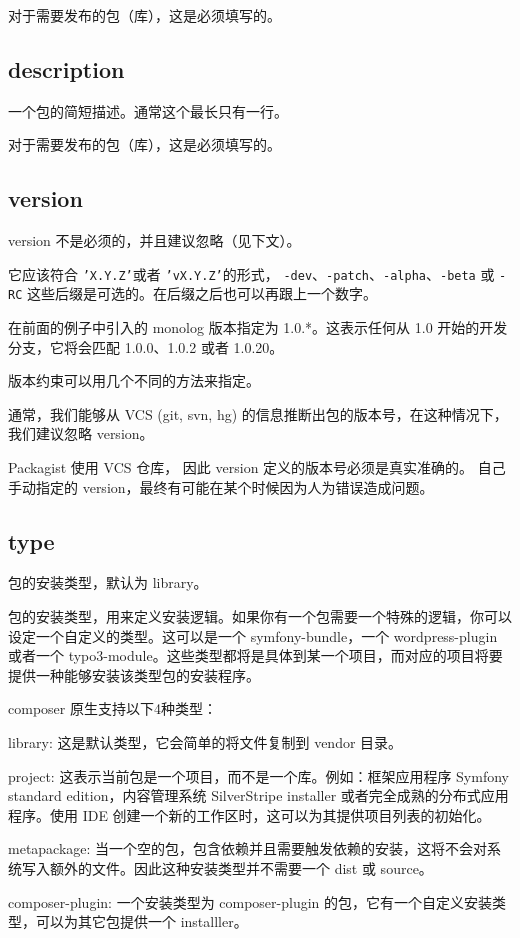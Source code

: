 对于需要发布的包（库），这是必须填写的。



\subsection{description}

一个包的简短描述。通常这个最长只有一行。

对于需要发布的包（库），这是必须填写的。


\subsection{version}

version 不是必须的，并且建议忽略（见下文）。

它应该符合 \texttt{'X.Y.Z'}或者 \texttt{'vX.Y.Z'}的形式， \texttt{-dev}、\texttt{-patch}、\texttt{-alpha}、\texttt{-beta} 或 \texttt{-RC} 这些后缀是可选的。在后缀之后也可以再跟上一个数字。

在前面的例子中引入的 monolog 版本指定为 1.0.*。这表示任何从 1.0 开始的开发分支，它将会匹配 1.0.0、1.0.2 或者 1.0.20。

版本约束可以用几个不同的方法来指定。

通常，我们能够从 VCS (git, svn, hg) 的信息推断出包的版本号，在这种情况下，我们建议忽略 version。

Packagist 使用 VCS 仓库， 因此 version 定义的版本号必须是真实准确的。 自己手动指定的 version，最终有可能在某个时候因为人为错误造成问题。

\subsection{type}

包的安装类型，默认为 library。

包的安装类型，用来定义安装逻辑。如果你有一个包需要一个特殊的逻辑，你可以设定一个自定义的类型。这可以是一个 symfony-bundle，一个 wordpress-plugin 或者一个 typo3-module。这些类型都将是具体到某一个项目，而对应的项目将要提供一种能够安装该类型包的安装程序。

composer 原生支持以下4种类型：

\begin{compactitem}
\item library: 这是默认类型，它会简单的将文件复制到 vendor 目录。
\item project: 这表示当前包是一个项目，而不是一个库。例如：框架应用程序 Symfony standard edition，内容管理系统 SilverStripe installer 或者完全成熟的分布式应用程序。使用 IDE 创建一个新的工作区时，这可以为其提供项目列表的初始化。
\item metapackage: 当一个空的包，包含依赖并且需要触发依赖的安装，这将不会对系统写入额外的文件。因此这种安装类型并不需要一个 dist 或 source。
\item composer-plugin: 一个安装类型为 composer-plugin 的包，它有一个自定义安装类型，可以为其它包提供一个 installler。
\end{compactitem}

